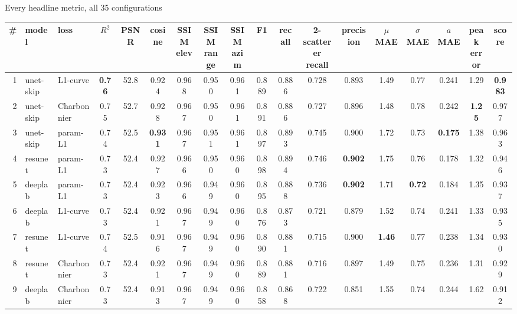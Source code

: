 \begin{frame}{Every headline metric, all 35 configurations}
  \centering
  \tiny
  \setlength{\tabcolsep}{2.4pt}
  \renewcommand{\arraystretch}{0.88}
  \begin{tabular}{@{}r l l c c c c c c c c c c c c c c c@{}}
    \toprule
    \# & model & loss & $R^2$ & PSNR & cosine & \shortstack{SSIM\\elev} & \shortstack{SSIM\\range} & \shortstack{SSIM\\azim} & F1 & recall & \shortstack{2-scatterer\\recall} & precision & $\mu$ MAE & $\sigma$ MAE & $a$ MAE & \shortstack{peak\\error} & score \\
    \midrule
    1 & unet-skip & L1-curve & \textbf{0.76} & 52.8 & 0.924 & 0.968 & 0.950 & 0.961 & 0.889 & 0.886 & 0.728 & 0.893 & 1.49 & 0.77 & 0.241 & 1.29 & \textbf{0.983} \\
    2 & unet-skip & Charbonnier & 0.75 & 52.7 & 0.928 & 0.967 & 0.950 & 0.961 & 0.891 & 0.886 & 0.727 & 0.896 & 1.48 & 0.78 & 0.242 & \textbf{1.25} & 0.977 \\
    3 & unet-skip & param-L1 & 0.74 & 52.5 & \textbf{0.931} & 0.967 & 0.951 & 0.961 & 0.897 & 0.893 & 0.745 & 0.900 & 1.72 & 0.73 & \textbf{0.175} & 1.38 & 0.963 \\
    4 & resunet & param-L1 & 0.73 & 52.4 & 0.927 & 0.966 & 0.950 & 0.960 & 0.898 & 0.894 & 0.746 & \textbf{0.902} & 1.75 & 0.76 & 0.178 & 1.32 & 0.946 \\
    5 & deeplab & param-L1 & 0.73 & 52.4 & 0.923 & 0.966 & 0.949 & 0.960 & 0.895 & 0.888 & 0.736 & \textbf{0.902} & 1.71 & \textbf{0.72} & 0.184 & 1.35 & 0.937 \\
    6 & deeplab & L1-curve & 0.73 & 52.4 & 0.921 & 0.967 & 0.949 & 0.960 & 0.876 & 0.873 & 0.721 & 0.879 & 1.52 & 0.74 & 0.241 & 1.33 & 0.935 \\
    7 & resunet & L1-curve & 0.74 & 52.5 & 0.916 & 0.967 & 0.949 & 0.960 & 0.890 & 0.881 & 0.715 & 0.900 & \textbf{1.46} & 0.77 & 0.238 & 1.34 & 0.930 \\
    8 & resunet & Charbonnier & 0.73 & 52.4 & 0.921 & 0.967 & 0.949 & 0.960 & 0.889 & 0.881 & 0.716 & 0.897 & 1.49 & 0.75 & 0.236 & 1.31 & 0.929 \\
    9 & deeplab & Charbonnier & 0.73 & 52.4 & 0.913 & 0.967 & 0.949 & 0.960 & 0.858 & 0.868 & 0.722 & 0.851 & 1.55 & 0.74 & 0.244 & 1.62 & 0.912 \\

\end{tabular}
\end{frame}
